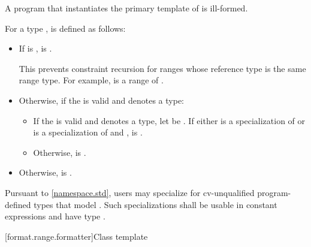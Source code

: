 \begin{itemdescr}
\pnum
A program that instantiates the primary template of 
is ill-formed.

\pnum
For a type ,  is defined as follows:
\begin{itemize}
\item
If 
is ,
 is .
\begin{note}
This prevents constraint recursion for ranges whose
reference type is the same range type.
For example,
 is a range of .
\end{note}

\item
Otherwise, if the  
is valid and denotes a type:
\begin{itemize}
\item
If the  
is valid and denotes a type,
let  be .
If either  is a specialization of  or
 is a specialization of  and
,
 is .
\item
Otherwise,  is .
\end{itemize}

\item
Otherwise,  is .
\end{itemize}

\pnum
\remarks
Pursuant to \ref{namespace.std}, users may specialize 
for cv-unqualified program-defined types
that model .
Such specializations shall be usable in constant expressions
and have type .
\end{itemdescr}

[format.range.formatter]{Class template }

